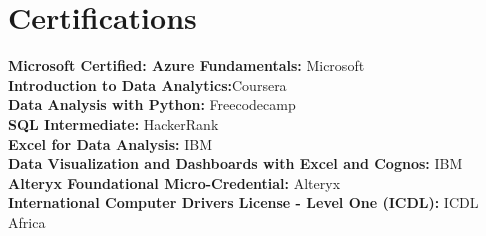 \documentclass[letterpaper,11pt]{article}
\begin{document}
\section{Certifications}
\begin{itemize}[leftmargin=0.15in, label={}]
    \small{\item{
     \textbf{Microsoft Certified: Azure Fundamentals:}{		Microsoft} \\
     \textbf{Introduction to Data Analytics:}{Coursera} \\
     \textbf{Data Analysis with Python:}{ Freecodecamp} \\
	\textbf{SQL Intermediate:}{	HackerRank} \\     
     \textbf{Excel for Data Analysis:}{	IBM} \\
     \textbf{Data Visualization and Dashboards with Excel and Cognos:}{	IBM} \\
     \textbf{Alteryx Foundational Micro-Credential:}{		Alteryx} \\
     \textbf{International Computer Drivers License - Level One (ICDL):}{		ICDL Africa} \\
     
 
     
    }}
 \end{itemize}
 

 
 



 
\end{document}
